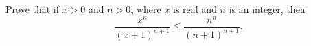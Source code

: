 Prove that if $x > 0$ and $n > 0$, where $x$ is real and $n$ is an integer,
then $$ \frac{x^n}{(x+1)^{n+1}} \le \frac{n^n}{(n+1)^{n+1}}. $$
